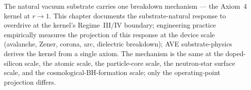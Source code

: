 \noindent
The natural vacuum substrate carries one breakdown mechanism --- the Axiom~4 kernel at $r \to 1$. This chapter documents the substrate-natural response to overdrive at the kernel's Regime~III/IV boundary; engineering practice empirically measures the projection of this response at the device scale (avalanche, Zener, corona, arc, dielectric breakdown); AVE substrate-physics derives the kernel from a single axiom. The mechanism is the same at the doped-silicon scale, the atomic scale, the particle-core scale, the neutron-star surface scale, and the cosmological-BH-formation scale; only the operating-point projection differs.
